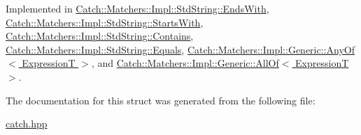Implemented in \hyperlink{a00016_a54715c94c215a1fc5fb6336acf52eb06}{Catch\+::\+Matchers\+::\+Impl\+::\+Std\+String\+::\+Ends\+With}, \hyperlink{a00076_a066fe10e74495cb556abc6895193ba97}{Catch\+::\+Matchers\+::\+Impl\+::\+Std\+String\+::\+Starts\+With}, \hyperlink{a00013_a226755351f3598179925f3ab89d6def7}{Catch\+::\+Matchers\+::\+Impl\+::\+Std\+String\+::\+Contains}, \hyperlink{a00017_a7a09449ff2f858981caf3b1f6c36d270}{Catch\+::\+Matchers\+::\+Impl\+::\+Std\+String\+::\+Equals}, \hyperlink{a00002_a7ecc6ec08b2018a643923a9d450aa328}{Catch\+::\+Matchers\+::\+Impl\+::\+Generic\+::\+Any\+Of$<$ Expression\+T $>$}, and \hyperlink{a00001_a9febc1e67acbeff62a32bcbfdc0c8fab}{Catch\+::\+Matchers\+::\+Impl\+::\+Generic\+::\+All\+Of$<$ Expression\+T $>$}.



The documentation for this struct was generated from the following file\+:\begin{DoxyCompactItemize}
\item 
\hyperlink{a00094}{catch.\+hpp}\end{DoxyCompactItemize}
